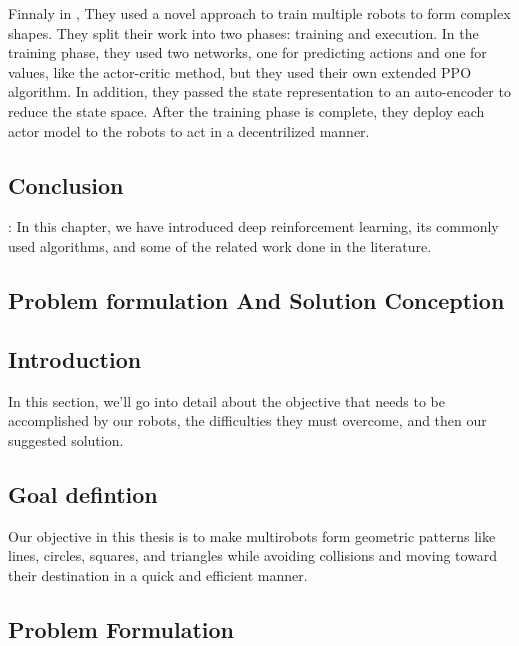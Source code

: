 \documentclass[12pt]{extarticle}
\begin{document}
Finnaly in \cite{wang2019pattern}, They used a novel approach to train multiple robots to form complex shapes. They split their work into two phases: training and execution. In the training phase, they used two networks, one for predicting actions and one for values, like the actor-critic method, but they used their own extended PPO algorithm. In addition, they passed the state representation to an auto-encoder to reduce the state space. After the training phase is complete, they deploy each actor model to the robots to act in a decentrilized manner.
\subsection{Conclusion}:
In this chapter, we have introduced deep reinforcement learning, its commonly used algorithms, and  some of the related work done in the literature.


 

  
  
  
\newpage
\pagebreak
\hspace{0pt}
\vfill
\begin{center}
\section{Problem formulation And Solution Conception}
\end{center}
\vfill
\hspace{0pt}

\pagebreak

 

\subsection{Introduction}
In this section, we'll go into detail about the objective that needs to be accomplished by our robots, the difficulties they must overcome, and then our suggested solution.
\subsection{Goal defintion}
Our objective in this thesis is to make multirobots form geometric patterns like lines, circles, squares, and triangles while avoiding collisions and moving toward their destination in a quick and efficient manner. 



\subsection{Problem Formulation}
 
\end{document}
